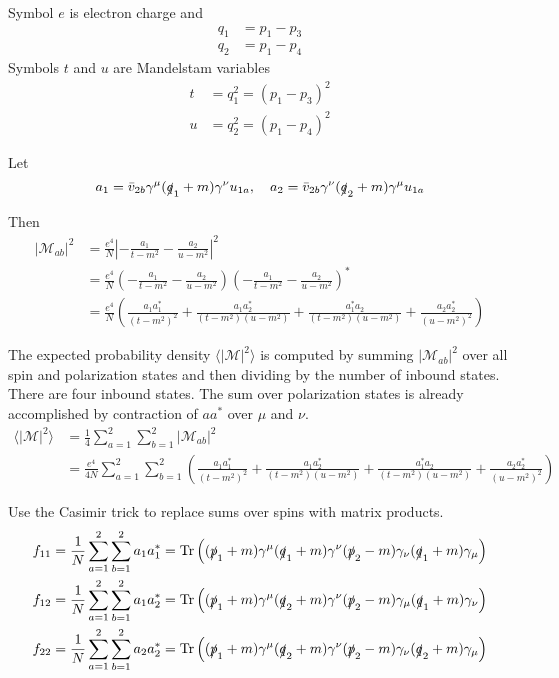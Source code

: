 \documentclass[12pt]{article}
\begin{document}
\noindent
Symbol $e$ is electron charge and
\begin{align*}
q_1&=p_1-p_3
\\
q_2&=p_1-p_4
\end{align*}
Symbols $t$ and $u$ are Mandelstam variables
\begin{align*}
t&=q_1^2=(p_1-p_3)^2
\\
u&=q_2^2=(p_1-p_4)^2
\end{align*}

\noindent
Let
\begin{equation*}
a_1=\bar{v}_{2b}\gamma^\mu(\slashed{q}_1+m)\gamma^\nu u_{1a},
\quad
a_2=\bar{v}_{2b}\gamma^\nu(\slashed{q}_2+m)\gamma^\mu u_{1a}
\end{equation*}

\noindent
Then
\begin{align*}
|\mathcal{M}_{ab}|^2&=\frac{e^4}{N}\left|-\frac{a_1}{t-m^2}-\frac{a_2}{u-m^2}\right|^2\\
&=
\frac{e^4}{N}
\left(-\frac{a_1}{t-m^2}-\frac{a_2}{u-m^2}\right)
\left(-\frac{a_1}{t-m^2}-\frac{a_2}{u-m^2}\right)^*\\
&=
\frac{e^4}{N}\left(
\frac{a_1a_1^*}{(t-m^2)^2}
+\frac{a_1a_2^*}{(t-m^2)(u-m^2)}
+\frac{a_1^*a_2}{(t-m^2)(u-m^2)}
+\frac{a_2a_2^*}{(u-m^2)^2}
\right)
\end{align*}

\noindent
The expected probability density $\langle|\mathcal{M}|^2\rangle$
is computed by summing $|\mathcal{M}_{ab}|^2$ over all spin and polarization states
and then dividing by the number of inbound states.
There are four inbound states.
The sum over polarization states is already accomplished by contraction
of $aa^*$ over $\mu$ and $\nu$.
\begin{align*}
\langle|\mathcal{M}|^2\rangle
&=\frac{1}{4}\sum_{a=1}^2\sum_{b=1}^2|\mathcal{M}_{ab}|^2\\
&=\frac{e^4}{4N}\sum_{a=1}^2\sum_{b=1}^2
\left(
\frac{a_1a_1^*}{(t-m^2)^2}
+\frac{a_1a_2^*}{(t-m^2)(u-m^2)}
+\frac{a_1^*a_2}{(t-m^2)(u-m^2)}
+\frac{a_2a_2^*}{(u-m^2)^2}
\right)
\end{align*}

\noindent
Use the Casimir trick to replace sums over spins with matrix products.
\begin{align*}
f_{11}&=\frac{1}{N} \sum_{a=1}^2\sum_{b=1}^2 a_1a_1^*=\mathop{\rm Tr}
\left(
(\slashed{p}_1+m)\gamma^\mu(\slashed{q}_1+m)\gamma^\nu(\slashed{p}_2-m)\gamma_\nu(\slashed{q}_1+m)\gamma_\mu
\right)
\\
f_{12}&=\frac{1}{N} \sum_{a=1}^2\sum_{b=1}^2 a_1a_2^*=\mathop{\rm Tr}
\left(
(\slashed{p}_1+m)\gamma^\mu(\slashed{q}_2+m)\gamma^\nu(\slashed{p}_2-m)\gamma_\mu(\slashed{q}_1+m)\gamma_\nu
\right)
\\
f_{22}&=\frac{1}{N} \sum_{a=1}^2\sum_{b=1}^2 a_2a_2^*=\mathop{\rm Tr}
\left(
(\slashed{p}_1+m)\gamma^\mu(\slashed{q}_2+m)\gamma^\nu(\slashed{p}_2-m)\gamma_\nu(\slashed{q}_2+m)\gamma_\mu
\right)
\end{align*}
\end{document}
